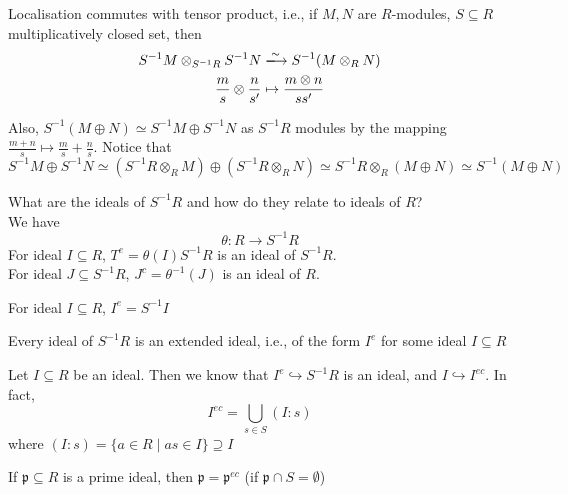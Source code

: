 \documentclass[oneside, 12pt]{scrbook}
\newcommand{\pr}{\mathfrak{p}}
\theoremstyle{theorem}
\begin{document}
\begin{proposition}
Localisation commutes with tensor product, i.e., if $M,N$ are $R$-modules, $S \subseteq R$ multiplicatively closed set, then 
\begin{align*}
S^{-1}M \otimes_{S^{-1}R} S^{-1}N &\xlongrightarrow{\sim} S^{-1} (M \otimes_{R} N )\\
\frac{m}{s} \otimes \frac{n}{s'} &\mapsto \frac{m \otimes n}{ss'}
\end{align*}
\end{proposition}

\begin{remark}
Also, $S^{-1}(M \oplus N) \simeq S^{-1}M \oplus S^{-1}N$ as $S^{-1}R$ modules by the mapping $\frac{m+n}{s} \mapsto \frac{m}{s} + \frac{n}{s}$. Notice that 
\begin{equation}
S^{-1}M \oplus S^{-1}N \simeq (S^{-1}R \otimes_{R} M) \oplus (S^{-1}R \otimes_{R} N) \simeq S^{-1}R \otimes_{R} (M \oplus N) \simeq S^{-1}(M \oplus N )
\end{equation}
\end{remark}

What are the ideals of $S^{-1}R$ and how do they relate to ideals of $R$?\\
We have \begin{equation}
\theta : R \rightarrow S^{-1}R
\end{equation}
For ideal $I \subseteq R$, $T^e = \theta(I)S^{-1}R$ is an ideal of $S^{-1}R$. \\
For ideal $J \subseteq S^{-1}R$, $J^c = \theta^{-1}(J)$ is an ideal of $R$.

\begin{lemma}
For ideal $I \subseteq R$, $I^e = S^{-1}I$
\end{lemma}

\begin{lemma}
Every ideal of $S^{-1}R$ is an extended ideal, i.e., of the form $I^e$ for some ideal $I \subseteq R$
\end{lemma}

\begin{lemma}
Let $I \subseteq R$ be an ideal. Then we know that $I^e \hookrightarrow S^{-1}R$ is an ideal, and $I \hookrightarrow I^{ec}$. In fact, $$I^{ec} = \bigcup_{s\in S} (I:s)$$ where $(I:s) = \{a \in R \mid as \in I\} \supseteq I$
\end{lemma}

\begin{corollary}
If $\pr \subseteq R$ is a prime ideal, then $\pr = \pr^{ec}$ (if $\pr \cap S = \emptyset$)
\end{corollary}
\end{document}
